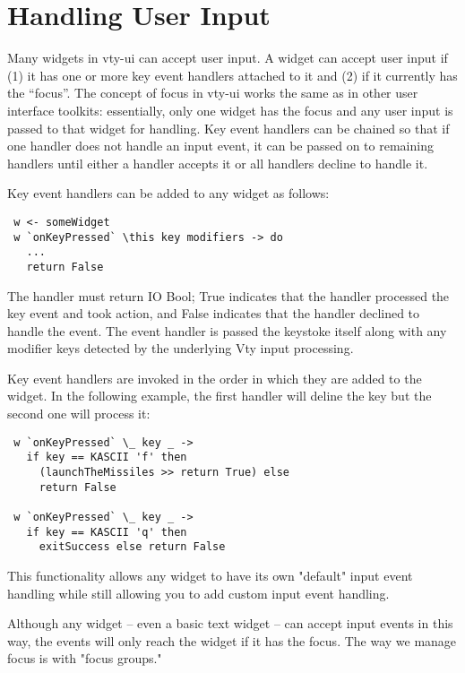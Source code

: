 \section{Handling User Input}

Many widgets in vty-ui can accept user input.  A widget can accept
user input if (1) it has one or more key event handlers attached to it
and (2) if it currently has the ``focus''.  The concept of focus in
vty-ui works the same as in other user interface toolkits:
essentially, only one widget has the focus and any user input is
passed to that widget for handling.  Key event handlers can be chained
so that if one handler does not handle an input event, it can be
passed on to remaining handlers until either a handler accepts it or
all handlers decline to handle it.

Key event handlers can be added to any widget as follows:

\begin{verbatim}
 w <- someWidget
 w `onKeyPressed` \this key modifiers -> do
   ...
   return False
\end{verbatim}

The handler must return IO Bool; True indicates that the handler
processed the key event and took action, and False indicates that the
handler declined to handle the event.  The event handler is passed the
keystoke itself along with any modifier keys detected by the underlying
Vty input processing.

Key event handlers are invoked in the order in which they are added to
the widget.  In the following example, the first handler will deline the
 key but the second one will process it:

\begin{verbatim}
 w `onKeyPressed` \_ key _ ->
   if key == KASCII 'f' then
     (launchTheMissiles >> return True) else
     return False

 w `onKeyPressed` \_ key _ ->
   if key == KASCII 'q' then
     exitSuccess else return False
\end{verbatim}

This functionality allows any widget to have its own "default" input
event handling while still allowing you to add custom input event
handling.

Although any widget -- even a basic text widget -- can accept input
events in this way, the events will only reach the widget if it has the
focus.  The way we manage focus is with "focus groups."

